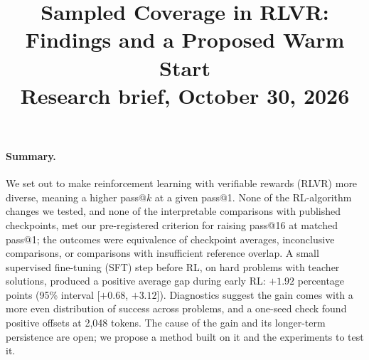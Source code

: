 \documentclass[11pt]{article}
\title{\vspace{-1.5em}Sampled Coverage in RLVR: Findings and a Proposed Warm Start\\[2pt]
\large Research brief, October 30, 2026}
\author{}
\date{}
\begin{document}
\maketitle
\vspace{-3.5em}

\paragraph{Summary.}
We set out to make reinforcement learning with verifiable rewards (RLVR) more diverse, meaning a higher pass@$k$ at a
given pass@1. None of the RL-algorithm changes we tested, and none of the interpretable comparisons with published
checkpoints, met our pre-registered criterion for raising pass@16 at matched pass@1; the outcomes were equivalence of
checkpoint averages, inconclusive comparisons, or comparisons with insufficient reference overlap. A small supervised
fine-tuning (SFT) step before RL, on hard problems with teacher solutions, produced a positive average gap during early
RL: $+1.92$ percentage points (95\% interval [$+0.68$, $+3.12$]). Diagnostics suggest the gain comes with a more even
distribution of success across problems, and a one-seed check found positive offsets at 2,048 tokens. The cause of
the gain and its longer-term persistence are open; we propose a method built on it and the experiments to test it.
\end{document}
